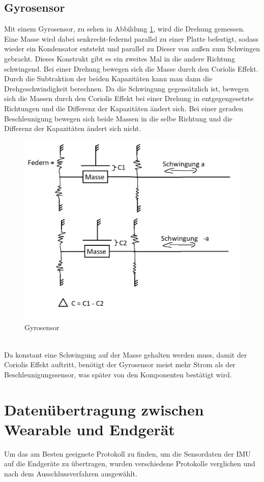 \subsection{Gyrosensor}
Mit einem Gyrosensor, zu sehen in Abbildung \ref{fig:pic_gyro}, wird die Drehung gemessen.
Eine Masse wird dabei senkrecht-federnd parallel zu einer Platte befestigt, sodass wieder ein Kondensator entsteht und parallel zu Dieser von außen zum Schwingen gebracht.
Dieses Konstrukt gibt es ein zweites Mal in die andere Richtung schwingend.
Bei einer Drehung bewegen sich die Masse durch den Coriolis Effekt.
Durch die Subtraktion der beiden Kapazitäten kann man dann die Drehgeschwindigkeit berechnen.
Da die Schwingung gegensätzlich ist, bewegen sich die Massen durch den Coriolis Effekt bei einer Drehung in entgegengesetzte Richtungen und die Differenz der Kapazitäten ändert sich.
Bei einer geraden Beschleunigung bewegen sich beide Massen in die selbe Richtung und die Differenz der Kapazitäten ändert sich nicht. \cite{gyrosensor}
\begin{figure}[h]
	\centering
	\includegraphics[width=0.65\linewidth]{res/gyro.jpg}
	\caption{Gyrosensor}
	\label{fig:pic_gyro}
\end{figure}\\
Da konstant eine Schwingung auf der Masse gehalten werden muss, damit der Coriolis Effekt auftritt, benötigt der Gyrosensor meist mehr Strom als der Beschleunigungssensor, was später von den Komponenten bestätigt wird.

\section{Datenübertragung zwischen Wearable und Endgerät}
Um das am Besten geeignete Protokoll zu finden, um die Sensordaten der IMU auf die Endgeräte zu übertragen, wurden verschiedene Protokolle verglichen und nach dem Ausschlussverfahren ausgewählt.

